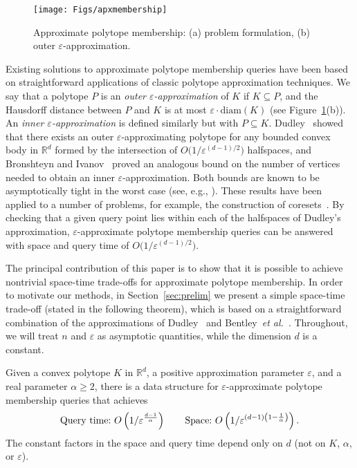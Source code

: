 \documentclass[11pt]{article}   \usepackage[letterpaper,hmargin=2.1cm,vmargin=3cm]{geometry}
\newcommand{\RE}{\mathbb{R}}    \newcommand{\ZZ}{\mathbb{Z}}    \newcommand{\eps}{\varepsilon}  \newcommand{\ST}{\,:\,}         \newcommand{\sq}{\square}
\newcommand{\inv}[1]{\frac{1}{#1}}
\newcommand{\diam}{\mathrm{diam}}
\newcommand{\etal}{\textit{et al.}}
\begin{document}
\begin{figure}[htbp]
  \centerline{\texttt{[image: Figs/apxmembership]}}
  \caption{Approximate polytope membership: (a) problem formulation, (b) outer $\eps$-approximation.}
  \label{fig:apxmembership}
\end{figure}


Existing solutions to approximate polytope membership queries have been based on straightforward applications of classic polytope approximation techniques. We say that a polytope $P$ is an \emph{outer $\eps$-approximation} of $K$ if $K \subseteq P$, and the Hausdorff distance between $P$ and $K$ is at most $\eps \cdot \diam(K)$ (see Figure~\ref{fig:apxmembership}(b)). An \emph{inner $\eps$-approximation} is defined similarly but with $P \subseteq K$. Dudley~\cite{Dudley} showed that there exists an outer $\eps$-approximating polytope for any bounded convex body in $\RE^d$ formed by the intersection of $O\big(1/\eps^{(d-1)/2}\big)$ halfspaces, and Bronshteyn and Ivanov~\cite{BrIv} proved an analogous bound on the number of vertices needed to obtain an inner $\eps$-approximation. Both bounds are known to be asymptotically tight in the worst case (see, e.g., \cite{Bro08}). These results have been applied to a number of problems, for example, the construction of coresets~\cite{kernel-survey}. By checking that a given query point lies within each of the halfspaces of Dudley's approximation, $\eps$-approximate polytope membership queries can be answered with space and query time of $O\big(1/\eps^{(d-1)/2}\big)$.

\medskip

The principal contribution of this paper is to show that it is possible to achieve nontrivial space-time trade-offs for approximate polytope membership. In order to motivate our methods, in Section~\ref{sec:prelim} we present a simple space-time trade-off (stated in the following theorem), which is based on a straightforward combination of the approximations of Dudley~\cite{Dudley} and Bentley~{\etal}~\cite{BFP}. Throughout, we will treat $n$ and $\eps$ as asymptotic quantities, while the dimension $d$ is a constant.

\begin{theorem} \label{thm:simple-trade-off}
Given a convex polytope $K$ in $\RE^d$, a positive approximation parameter $\eps$, and a real parameter $\alpha \geq 2$, there is a data structure for $\eps$-approximate polytope membership queries that achieves
\[
\hbox{Query time:~} O\left(1/\eps^{\frac{d-1}{\alpha}}\right)
\qquad
\textrm{Space:~} O\left( 1/\eps^{(d-1)\left(1 - \inv{\alpha} \right)} \right).
\]
The constant factors in the space and query time depend only on $d$ (not on $K$, $\alpha$, or $\eps$). 
\end{theorem}
\end{document}
